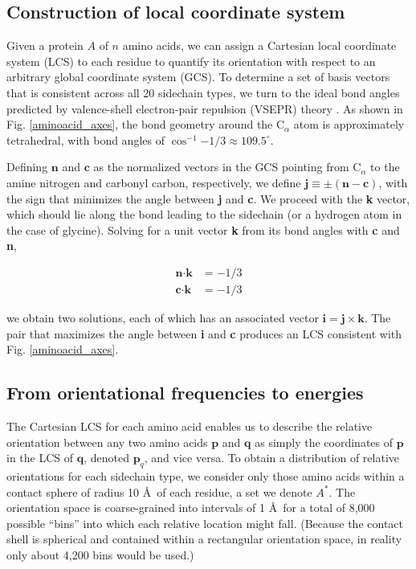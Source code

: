 \documentclass[11pt,titlepage]{article}
\begin{document}
\subsection{Construction of local coordinate system}
Given a protein $A$ of $n$ amino acids, we can assign a Cartesian local coordinate system (LCS) to each residue to quantify its orientation with respect to an arbitrary global coordinate system (GCS).
To determine a set of basis vectors that is consistent across all 20 sidechain types, we turn to the ideal bond angles predicted by valence-shell electron-pair repulsion (VSEPR) theory \cite{gillespie}.
As shown in Fig. \ref{aminoacid_axes}, the bond geometry around the C$_\alpha$ atom is approximately tetrahedral, with bond angles of $\cos^{-1}{-1/3}\approx 109.5^\circ$.

Defining $\textbf{n}$ and $\textbf{c}$ as the normalized vectors in the GCS pointing from C$_\alpha$ to the amine nitrogen and carbonyl carbon, respectively, we define $\textbf{j} \equiv \pm(\textbf{n} - \textbf{c})$, with the sign that minimizes the angle between \textbf{j} and \textbf{c}.
We proceed with the \textbf{k} vector, which should lie along the bond leading to the sidechain (or a hydrogen atom in the case of glycine).
Solving for a unit vector \textbf{k} from its bond angles with \textbf{c} and \textbf{n},

\begin{align*}
\textbf{n}\cdot\textbf{k} &= -1/3
\\ \textbf{c}\cdot\textbf{k} &= -1/3
\end{align*}

we obtain two solutions, each of which has an associated vector $\textbf{i}=\textbf{j}\times\textbf{k}$.
The pair that maximizes the angle between \textbf{i} and \textbf{c} produces an LCS consistent with Fig. \ref{aminoacid_axes}.

\subsection{From orientational frequencies to energies}
The Cartesian LCS for each amino acid enables us to describe the relative orientation between any two amino acids $\textbf{p}$ and $\textbf{q}$ as simply the coordinates of $\textbf{p}$ in the LCS of $\textbf{q}$, denoted $\textbf{p}_q$, and vice versa.
To obtain a distribution of relative orientations for each sidechain type, we consider only those amino acids within a contact sphere of radius 10 \AA\, of each residue, a set we denote $A^*$.
The orientation space is coarse-grained into intervals of 1 \AA\, for a total of 8,000 possible ``bins'' into which each relative location might fall. (Because the contact shell is spherical and contained within a rectangular orientation space, in reality only about 4,200 bins would be used.)
\end{document}
